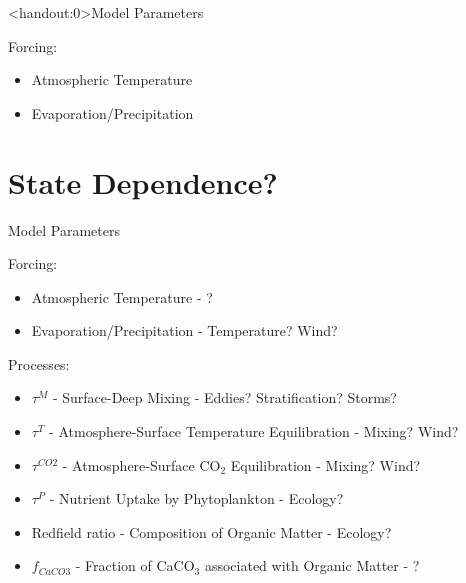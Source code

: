 \begin{frame}<handout:0>{Model Parameters}
    
    Forcing:
    \begin{itemize}
        \item Atmospheric Temperature
        \item Evaporation/Precipitation
    \end{itemize}


\end{frame}

\section{State Dependence?}

\begin{frame}{Model Parameters}
    
    Forcing:
    \begin{itemize}
        \item Atmospheric Temperature - {\color{QESdarkblue} ?}
        \item Evaporation/Precipitation - {\color{QESdarkblue} Temperature? Wind?}
    \end{itemize}

    Processes:
    \begin{itemize}
        \item $\tau^M$ - Surface-Deep Mixing - {\color{QESdarkblue} Eddies? Stratification? Storms?}
        \item $\tau^T$ - Atmosphere-Surface Temperature Equilibration - {\color{QESdarkblue} Mixing? Wind?}
        \item $\tau^{CO2}$ - Atmosphere-Surface CO$_2$ Equilibration - {\color{QESdarkblue} Mixing? Wind?}
        \item $\tau^P$ - Nutrient Uptake by Phytoplankton - {\color{QESdarkblue} Ecology?}
        \item Redfield ratio - Composition of Organic Matter - {\color{QESdarkblue} Ecology?}
        \item $f_{CaCO3}$ - Fraction of CaCO$_3$ associated with Organic Matter - {\color{QESdarkblue} \ce{\Omega}?}
    \end{itemize}

\end{frame}

